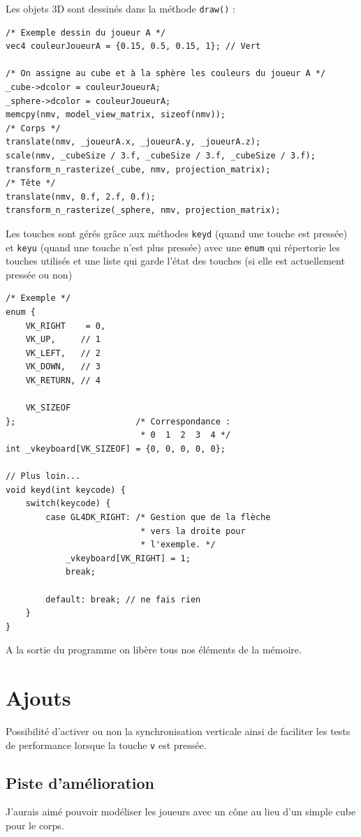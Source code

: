 \documentclass{article}
\begin{document}
    Les objets 3D sont dessinés dans la méthode \texttt{draw()} :
    \begin{center}\begin{minipage}{0.9\textwidth}
        \begin{verbatim}
/* Exemple dessin du joueur A */
vec4 couleurJoueurA = {0.15, 0.5, 0.15, 1}; // Vert

/* On assigne au cube et à la sphère les couleurs du joueur A */
_cube->dcolor = couleurJoueurA;
_sphere->dcolor = couleurJoueurA;
memcpy(nmv, model_view_matrix, sizeof(nmv));
/* Corps */
translate(nmv, _joueurA.x, _joueurA.y, _joueurA.z);
scale(nmv, _cubeSize / 3.f, _cubeSize / 3.f, _cubeSize / 3.f);
transform_n_rasterize(_cube, nmv, projection_matrix);
/* Tête */
translate(nmv, 0.f, 2.f, 0.f);
transform_n_rasterize(_sphere, nmv, projection_matrix);
        \end{verbatim}
    \end{minipage}\end{center}
    \vspace{10pt}

    Les touches sont gérés grâce aux méthodes \texttt{keyd} (quand une touche est pressée) et \texttt{keyu} (quand une touche n'est plus pressée) avec une \texttt{enum} qui répertorie les touches utilisés et une liste qui garde l'état des touches (si elle est actuellement pressée ou non)
    \begin{center}\begin{minipage}{0.9\textwidth}
        \begin{verbatim}
/* Exemple */
enum {
    VK_RIGHT    = 0,
    VK_UP,     // 1
    VK_LEFT,   // 2
    VK_DOWN,   // 3
    VK_RETURN, // 4

    VK_SIZEOF
};                        /* Correspondance :
                           * 0  1  2  3  4 */
int _vkeyboard[VK_SIZEOF] = {0, 0, 0, 0, 0};

// Plus loin...
void keyd(int keycode) {
    switch(keycode) {
        case GL4DK_RIGHT: /* Gestion que de la flèche
                           * vers la droite pour
                           * l'exemple. */
            _vkeyboard[VK_RIGHT] = 1;
            break;

        default: break; // ne fais rien
    }
}
        \end{verbatim}
    \end{minipage}\end{center}
    \vspace{10pt}

    A la sortie du programme on libère tous nos éléments de la mémoire.

    \section{Ajouts}
    Possibilité d'activer ou non la synchronisation verticale ainsi de faciliter les tests de performance lorsque la touche \texttt{v} est pressée.

    \subsection{Piste d'amélioration}
    J'aurais aimé pouvoir modéliser les joueurs avec un cône au lieu d'un simple cube pour le corps.
\end{document}
